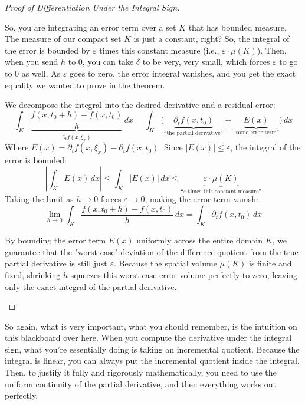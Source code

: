 \begin{proof}[Proof of Differentiation Under the Integral Sign]
\begin{spoken-clean}[00:03:00 - 00:06:18]
So, you are integrating an error term over a set $K$ that has bounded measure. The measure of our compact set $K$ is just a constant, right? So, the integral of the error is bounded by $\varepsilon$ times this constant measure (i.e., $\varepsilon \cdot \mu(K)$). Then, when you send $h$ to $0$, you can take $\delta$ to be very, very small, which forces $\varepsilon$ to go to $0$ as well. As $\varepsilon$ goes to zero, the error integral vanishes, and you get the exact equality we wanted to prove in the theorem.
\end{spoken-clean}

\begin{math-stroke}
We decompose the integral into the desired derivative and a residual error:
\[
\int_K \underbrace{\frac{f(x, t_0+h) - f(x, t_0)}{h}}_{\partial_t f(x, \xi_x)} \, dx = \int_K \big( \underbrace{\partial_t f(x, t_0)}_{\text{``the partial derivative''}} + \underbrace{E(x)}_{\text{``some error term''}} \big) \, dx
\]
Where $E(x) = \partial_t f(x, \xi_x) - \partial_t f(x, t_0)$. Since $|E(x)| \le \varepsilon$, the integral of the error is bounded:
\[
\left| \int_K E(x) \, dx \right| \le \int_K |E(x)| \, dx \le \underbrace{\varepsilon \cdot \mu(K)}_{\text{``} \varepsilon \text{ times this constant measure''}}
\]
Taking the limit as $h \to 0$ forces $\varepsilon \to 0$, making the error term vanish:
\[
\lim_{h \to 0} \int_K \frac{f(x, t_0+h) - f(x, t_0)}{h} \, dx = \int_K \partial_t f(x, t_0) \, dx
\]

\begin{explanation-of-steps}
By bounding the error term $E(x)$ uniformly across the entire domain $K$, we guarantee that the "worst-case" deviation of the difference quotient from the true partial derivative is still just $\varepsilon$. Because the spatial volume $\mu(K)$ is finite and fixed, shrinking $h$ squeezes this worst-case error volume perfectly to zero, leaving only the exact integral of the partial derivative.
\end{explanation-of-steps}
\end{math-stroke}
\end{proof}

\begin{spoken-clean}[00:06:18 - 00:08:45]
So again, what is very important, what you should remember, is the intuition on this blackboard over here. When you compute the derivative under the integral sign, what you're essentially doing is taking an incremental quotient. Because the integral is linear, you can always put the incremental quotient inside the integral. Then, to justify it fully and rigorously mathematically, you need to use the uniform continuity of the partial derivative, and then everything works out perfectly.
\end{spoken-clean}

